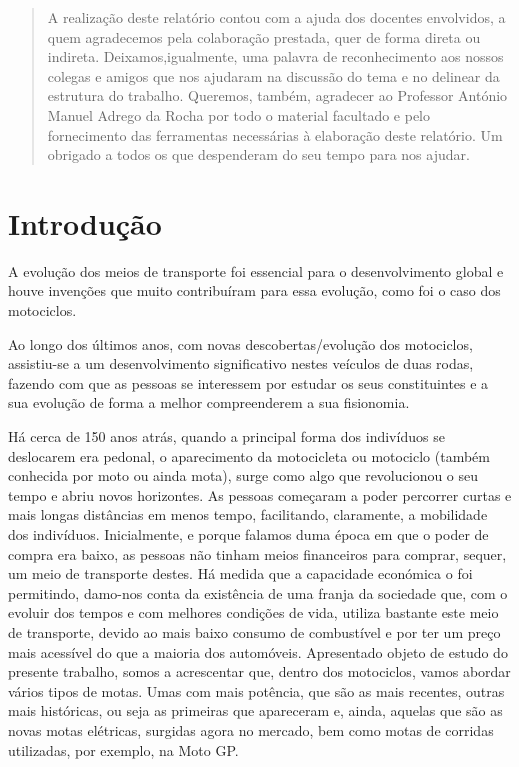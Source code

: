 \documentclass{report}
\begin{document}
\renewcommand{\abstractname}{Agradecimentos}
\begin{abstract}
\vspace{1cm}
	A realização deste relatório contou com a ajuda dos docentes envolvidos, a quem agradecemos pela colaboração prestada, quer de forma direta ou indireta. Deixamos,igualmente, uma palavra de reconhecimento aos nossos colegas e amigos que nos ajudaram na discussão do tema e no delinear da estrutura do trabalho. Queremos, também, agradecer ao Professor António Manuel Adrego da Rocha por todo o material facultado e pelo fornecimento das ferramentas necessárias à elaboração deste relatório. Um obrigado a todos os que despenderam do seu tempo para nos ajudar.
\end{abstract}


\tableofcontents


\clearpage
{}

\chapter{Introdução}
\label{chap.introducao}
\vspace{1cm}
A evolução dos meios de transporte foi essencial para o desenvolvimento global e houve invenções que muito contribuíram para essa evolução, como foi o caso dos motociclos.

Ao longo dos últimos anos, com novas descobertas/evolução dos motociclos, assistiu-se a um desenvolvimento significativo nestes veículos de duas rodas, fazendo com que as pessoas se interessem por estudar os seus constituintes e a sua evolução de forma a melhor compreenderem a sua fisionomia.

Há cerca de 150 anos atrás, quando a principal forma dos indivíduos se deslocarem era pedonal, o aparecimento da motocicleta ou motociclo (também conhecida por moto ou ainda mota), surge como algo que revolucionou o seu tempo e abriu novos horizontes. As pessoas começaram a poder percorrer curtas e mais longas distâncias em menos tempo, facilitando, claramente, a mobilidade dos indivíduos. Inicialmente, e porque falamos duma época em que o poder de compra era baixo, as pessoas não tinham meios financeiros para comprar, sequer, um meio de transporte destes. Há medida que a capacidade económica o foi permitindo, damo-nos conta da existência de uma franja da sociedade que, com o evoluir dos tempos e com melhores condições de vida, utiliza bastante este meio de transporte, devido ao mais baixo consumo de combustível e por ter um preço mais acessível do que a maioria dos automóveis.
Apresentado objeto de estudo do presente trabalho, somos a acrescentar que, dentro dos motociclos, vamos abordar vários tipos de motas. Umas com mais potência, que são as mais recentes, outras mais históricas, ou seja as primeiras que apareceram e, ainda, aquelas que são as novas motas elétricas, surgidas agora no mercado, bem como motas de corridas utilizadas, por exemplo, na Moto GP.
\end{document}

